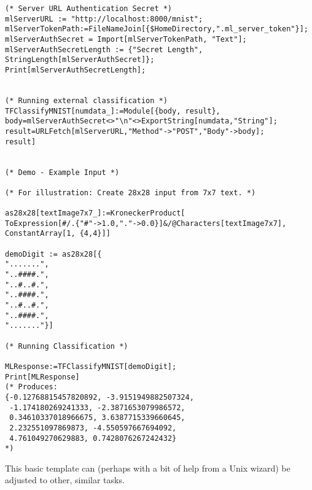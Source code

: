 \documentclass[11pt]{article}
\begin{document}
\begin{verbatim}
(* Server URL Authentication Secret *)
mlServerURL := "http://localhost:8000/mnist";
mlServerTokenPath:=FileNameJoin[{$HomeDirectory,".ml_server_token"}];
mlServerAuthSecret = Import[mlServerTokenPath, "Text"];
mlServerAuthSecretLength := {"Secret Length", StringLength[mlServerAuthSecret]};
Print[mlServerAuthSecretLength];


(* Running external classification *)
TFClassifyMNIST[numdata_]:=Module[{body, result},
body=mlServerAuthSecret<>"\n"<>ExportString[numdata,"String"];
result=URLFetch[mlServerURL,"Method"->"POST","Body"->body];
result]


(* Demo - Example Input *)

(* For illustration: Create 28x28 input from 7x7 text. *)

as28x28[textImage7x7_]:=KroneckerProduct[
ToExpression[#/.{"#"->1.0,"."->0.0}]&/@Characters[textImage7x7],
ConstantArray[1, {4,4}]]

demoDigit := as28x28[{
".......",
"..####.",
"..#..#.",
"..####.",
"..#..#.",
"..####.",
"......."}]

(* Running Classification *)

MLResponse:=TFClassifyMNIST[demoDigit];
Print[MLResponse]
(* Produces:
{-0.12768815457820892, -3.9151949882507324,
 -1.174180269241333, -2.3871653079986572,
 0.34610337018966675, 3.6387715339660645,
 2.232551097869873, -4.550597667694092,
 4.761049270629883, 0.7428076267242432}
*)

\end{verbatim}

    This basic template can (perhaps with a bit of help from a Unix wizard)
be adjusted to other, similar tasks.


    
    
    
\end{document}
